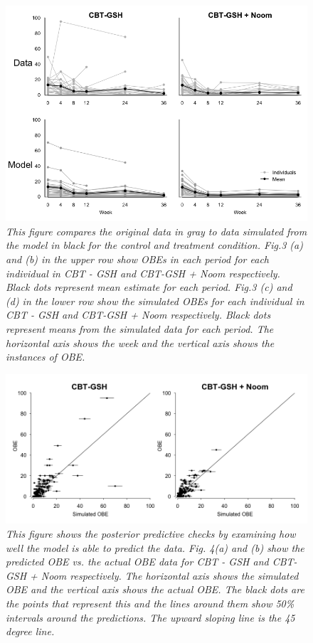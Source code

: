 \documentclass{article}
\begin{document}
\begin{figure}[H]
\begin{center}
\includegraphics[width=\textwidth, height=\textheight, keepaspectratio]{ppc_sims.png}
\caption{\emph{This figure compares the original data in gray to data simulated from the model in black for the control and treatment condition. Fig.3 (a) and (b) in the upper row show OBEs in each period for each individual in CBT - GSH and CBT-GSH + Noom respectively. Black dots represent mean estimate for each  period. Fig.3 (c) and (d) in the lower row show the simulated OBEs for each individual in CBT - GSH and CBT-GSH + Noom respectively. Black dots represent means from the simulated data for each period. The horizontal axis shows the week and the vertical axis shows the instances of OBE.}}
\end{center}
\end{figure}

\begin{figure}[H]
\begin{center}
\includegraphics[width=\textwidth, height=\textheight, keepaspectratio]{obe_ppcs.png}
\caption{\emph{This figure shows the posterior predictive checks by examining how well the model is able to predict the data. Fig. 4(a) and (b) show the predicted OBE vs. the actual OBE data for CBT - GSH and CBT- GSH + Noom respectively. The horizontal axis shows the simulated OBE and the vertical axis shows the actual OBE. The black dots are the points that represent this and the lines around them show 50\% intervals around the predictions. The upward sloping line is the 45 degree line.}}
\end{center}
\end{figure}
\end{document}

